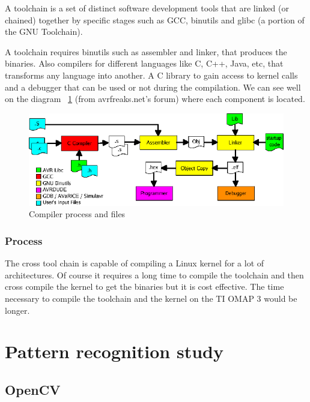 	\par A toolchain is a set of distinct software development tools that are linked (or chained) together by specific stages such as GCC, binutils and glibc (a portion of the GNU Toolchain)\cite{Toolchain}.
	\par A toolchain requires binutils such as assembler and linker, that produces the binaries. Also compilers for different languages like C, C++, Java, etc, that transforms any language into another. A C library to gain access to kernel calls and a debugger that can be used or not during the compilation. We can see well on the diagram 
~\ref{compilechain} (from avrfreaks.net's forum)  where each component is located.
	\begin{figure}[h]
		\begin{center}
			\includegraphics[scale=0.5]{images_not_compressed/compchain.png}
			\caption{Compiler process and files}
			\label{compilechain}
		\end{center}
	\end{figure}
	
	
	\subsubsection{Process}
	\par The cross tool chain is capable of compiling a Linux kernel for a lot of architectures. Of course it requires a long time to compile the toolchain and then cross compile the kernel to get the binaries but it is cost effective. The time necessary to compile the toolchain and the kernel on the TI OMAP 3 would be longer.

		
	\section{Pattern recognition study}
	\subsection{OpenCV}
	
